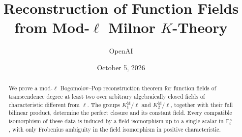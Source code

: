 \documentclass[11pt]{article}
\title{Reconstruction of Function Fields\texorpdfstring{\\}{ }
from Mod-\texorpdfstring{$\ell$}{ell} Milnor \texorpdfstring{$K$}{K}-Theory}
\author{OpenAI}
\date{October 5, 2026}
\theoremstyle{definition}
\theoremstyle{remark}
\numberwithin{equation}{section}
\newcommand{\F}{\mathbb F}
\begin{document}
\maketitle
\begin{abstract}
We prove a mod-$\ell$ Bogomolov--Pop reconstruction theorem for function
fields of transcendence degree at least two over arbitrary algebraically
closed fields of characteristic different from $\ell$. The groups
$K^{\mathrm M}_1/\ell$ and $K^{\mathrm M}_2/\ell$, together with their full
bilinear product, determine the perfect closure and its constant field.
Every compatible isomorphism of these data is induced by a field isomorphism
up to a single scalar in $\F_\ell^\times$, with only Frobenius ambiguity in
the field isomorphism in positive characteristic.
\end{abstract}
\setcounter{tocdepth}{1}
\tableofcontents
\clearpage








\clearpage

\end{document}
